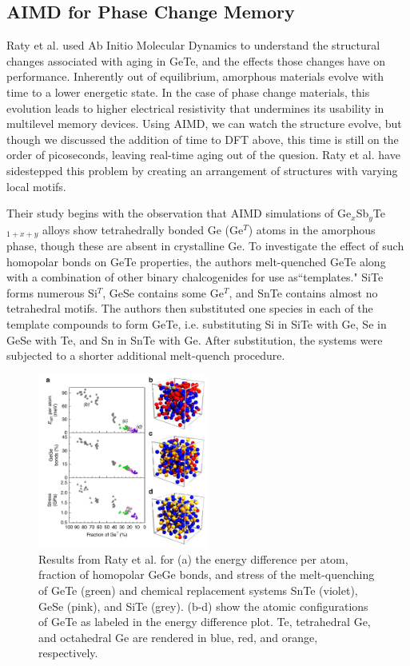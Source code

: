 \documentclass[3p,review,12pt]{elsarticle}
\begin{document}
\subsection{AIMD for Phase Change Memory}
Raty et al. \cite{Raty2015} used Ab Initio Molecular Dynamics to understand the structural changes associated with aging in GeTe, and the effects those changes have on performance. Inherently out of equilibrium, amorphous materials evolve with time to a lower energetic state. In the case of phase change materials, this evolution leads to higher electrical resistivity that undermines its usability in multilevel memory devices. Using AIMD, we can watch the structure evolve, but though we discussed the addition of time to DFT above, this time is still on the order of picoseconds, leaving real-time aging out of the quesion. Raty et al. have sidestepped this problem by creating an arrangement of structures with varying local motifs. 
\par
Their study begins with the observation that AIMD simulations of Ge$_{x}$Sb$_{y}$Te$_{1+x+y}$ alloys show tetrahedrally bonded Ge (Ge$^{T}$) atoms in the amorphous phase, though these are absent in crystalline Ge. To investigate the effect of such homopolar bonds on GeTe properties, the authors melt-quenched GeTe along with a combination of other binary chalcogenides for use as``templates." SiTe forms numerous Si$^{T}$, GeSe contains some Ge$^{T}$, and SnTe contains almost no tetrahedral motifs.  The authors then substituted one species in each of the template compounds to form GeTe, i.e. substituting Si in SiTe with Ge, Se in GeSe with Te, and Sn in SnTe with Ge. After substitution, the systems were subjected to a shorter additional melt-quench procedure.
\begin{figure}[h]
	\includegraphics[width=0.5\textwidth]{raty1}
	\centering
	\caption{Results from Raty et al. \cite{Raty2015} for (a) the energy difference per atom, fraction of homopolar GeGe bonds, and stress of the melt-quenching of GeTe (green) and chemical replacement systems SnTe (violet), GeSe (pink), and SiTe (grey). (b-d) show the atomic configurations of GeTe as labeled in the energy difference plot. Te, tetrahedral Ge, and octahedral Ge are rendered in blue, red, and orange, respectively.} 
\end{figure}
\end{document}
